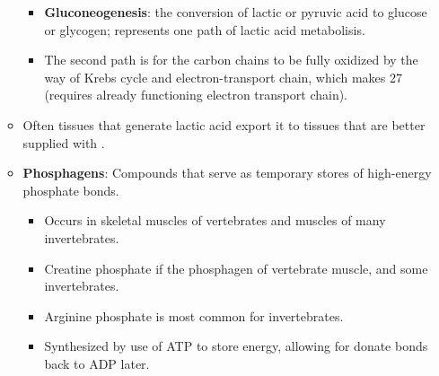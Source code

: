 \documentclass[12pt,a4paper]{article}
\begin{document}
\begin{itemize}
\begin{itemize}
            \begin{itemize}
                \item \textbf{Gluconeogenesis}: the conversion of lactic or pyruvic acid to glucose or glycogen; represents one path of lactic acid metabolisis.
                \item The second path is for the carbon chains to be fully oxidized by the way of Krebs cycle and electron-transport chain, which makes 27 (requires already functioning electron transport chain).
            \end{itemize}
        \item Often tissues that generate lactic acid export it to tissues that are better supplied with .
        \item \textbf{Phosphagens}: Compounds that serve as temporary stores of high-energy phosphate bonds.
            \begin{itemize}
                \item Occurs in skeletal muscles of vertebrates and muscles of many invertebrates.
                \item Creatine phosphate if the phosphagen of vertebrate muscle, and some invertebrates.
                \item Arginine phosphate is most common for invertebrates.
                \item Synthesized by use of ATP to store energy, allowing for donate bonds back to ADP later.
            \end{itemize}
    \end{itemize}
\end{itemize}
\end{document}
